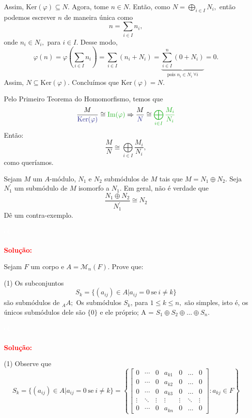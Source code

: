 \documentclass[11pt,a4paper]{article}
\newcounter{exercicio}[section]
\newcommand{\dividiritens}[1]{\begin{tasks}[counter-format={(tsk[a])},label-width=3.6ex, label-format = {\bfseries}, column-sep = {0pt}](1) #1 \end{tasks}}
\newcommand{\pers}[1]{\textcolor{Floresta}{$\negrito{(#1)} $}}
\newcommand{\solucao}[1]{
\textbf{\textcolor{white}{oi}\\ \\ \textcolor{red}{Solução:}} #1}
\begin{document}
{\begin{itemize}
\[    \]
    Assim, $\mbox{Ker}(\varphi) \subseteq N.$
    Agora, tome $n \in N.$ Então, como $N = \bigoplus\limits_{i \in I} N_i,$ então podemos escrever $n$ de maneira única como
    \[
    n = \sum\limits_{i \in I} n_i,
    \]
    onde $n_i \in N_i,$ para $i \in I.$
    Desse modo,
    \[
    \varphi(n) = \varphi\left(  \sum\limits_{i \in I} n_i \right) = \sum\limits_{i \in I} (n_i + N_i) = \underbrace{\sum\limits_{i \in I}^n (0 + N_i)}_{\mbox{pois } n_i \in N_i \ \forall i} = 0.
    \]
    Assim, $N \subseteq \mbox{Ker}(\varphi).$
    Concluímos que $\mbox{Ker}(\varphi) = N.$
\end{itemize}

Pelo Primeiro Teorema do Homomorfismo, temos que
\[
    \frac{M}{\textcolor{Blue}{\mbox{Ker}(\varphi)}} \cong \textcolor{Verde}{\mbox{Im}(\varphi)} \Rightarrow  \frac{M}{\textcolor{Blue}{N}} \cong \textcolor{Verde}{ \bigoplus\limits_{i\in I}  \frac{M_i}{N_i}} 
\]
Então:
\[
\frac{M}{N} \cong \bigoplus\limits_{i \in I} \frac{M_i}{N_i},
\]
como queríamos.
}

 Sejam $M$ um $A$-módulo, $N_1$ e $N_2$ submódulos de $M$ tais que $M = N_1 \oplus N_2.$ Seja $N^\prime_1$ um submódulo de $M$ isomorfo a $N_1.$ Em geral, não é verdade que
\[
\frac{N_1 \oplus N_2}{N_1^{\prime}} \cong N_2
\]
Dê um contra-exemplo.
\solucao{}

 Sejam $F$ um corpo e $A = \mathcal{M}_n(F).$ Prove que:
\dividiritens{
\task[\pers{a}] Os subconjuntos
\[
S_k = \{ (a_{ij}) \in A | a_{ij} = 0 \ \mbox{se} \ i \neq k \}
\]
são submódulos de ${}_AA;$
\task[\pers{b}] Os submódulos $S_k$, para $1 \le k \le n,$ são simples, isto é, os únicos submódulos dele são $\{0\}$ e ele próprio;
\task[\pers{c}] A = $S_1 \oplus S_2 \oplus \ldots \oplus S_n.$
}
\solucao{
\dividiritens{
\task[\pers{a}] Observe que 
\[
S_k = \{ (a_{ij}) \in A | a_{ij} = 0 \ \mbox{se} \ i \neq k \} = \left\{ 
\begin{bmatrix} 
0 & \cdots & 0 & a_{k1} & 0 & \ldots & 0 \\
0 & \cdots & 0 & a_{k2} & 0 & \ldots & 0 \\
0 & \cdots & 0 & a_{k3} & 0 & \ldots & 0 \\
\vdots & \ddots & \vdots &  \vdots &  \vdots & \ddots &  \vdots \\
0 & \cdots & 0 & a_{kn} & 0 & \ldots & 0
\end{bmatrix} : a_{kj} \in F \right\}
\]

}
}
\end{document}
